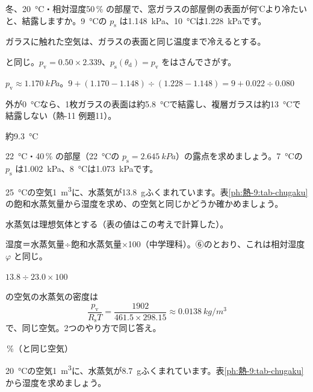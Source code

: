 \begin{reidai}[窓ガラスに結露する温度]
\label{ph:熱-9:ex11}冬、\qty{20}{\celsius}・相対湿度50\,\% の部屋で、窓ガラスの部屋側の表面が何℃より冷たいと、結露しますか。\qty{9}{\celsius}の $p_{\mathrm s}$ は\qty{1.148}{kPa}、\qty{10}{\celsius}は\qty{1.228}{kPa}です。
\par{} ガラスに触れた空気は、ガラスの表面と同じ温度まで冷えるとする。
\par\kangaekata {}と同じ。$p_{\mathrm v}=0.50\times2.339$、$p_{\mathrm s}(\theta_{\mathrm d})=p_{\mathrm v}$ をはさんでさがす。
\par\shiki $p_{\mathrm v}\approx\qty{1.170}{kPa}$。$9+(1.170-1.148)\div(1.228-1.148)=9+0.022\div0.080$
\par{} 外が\qty{0}{\celsius}なら、1枚ガラスの表面は約\qty{5.8}{\celsius}で結露し、複層ガラスは約\qty{13}{\celsius}で結露しない（熱-11 例題11）。
\par\kotae 約\qty{9.3}{\celsius}
\end{reidai}
\begin{jibun}
\qty{22}{\celsius}・40\,\% の部屋（\qty{22}{\celsius}の $p_{\mathrm s}=\qty{2.645}{kPa}$）の露点を求めましょう。\qty{7}{\celsius}の $p_{\mathrm s}$ は\qty{1.002}{kPa}、\qty{8}{\celsius}は\qty{1.073}{kPa}です。
\end{jibun}

\begin{reidai}[中学の表で湿度を求める]
\label{ph:熱-9:ex12}\qty{25}{\celsius}の空気\qty{1}{m^3}に、水蒸気が\qty{13.8}{g}ふくまれています。表\ref{ph:熱-9:tab-chugaku}の飽和水蒸気量から湿度を求め、の空気と同じかどうか確かめましょう。
\par{} 水蒸気は理想気体とする（表の値はこの考えで計算した）。
\par\kangaekata 湿度＝水蒸気量÷飽和水蒸気量×100（中学理科）。⑥のとおり、これは相対湿度 $\varphi$ と同じ。
\par\shiki $13.8\div23.0\times100$
\par{} の空気の水蒸気の密度は
\[ \frac{p_{\mathrm v}}{R_{\mathrm s}T}=\frac{1902}{461.5\times298.15}\approx\qty{0.0138}{kg/m^3} \]
で、同じ空気。2つのやり方で同じ答え。
\par{}\,\%（と同じ空気）
\end{reidai}
\begin{jibun}
\qty{20}{\celsius}の空気\qty{1}{m^3}に、水蒸気が\qty{8.7}{g}ふくまれています。表\ref{ph:熱-9:tab-chugaku}から湿度を求めましょう。
\end{jibun}

